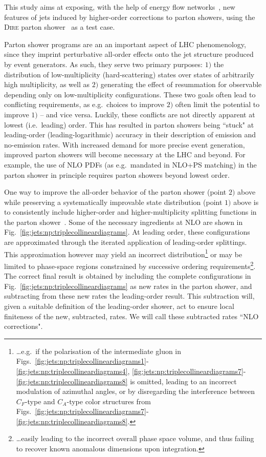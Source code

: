 
This study aims at exposing, with the help of energy flow 
networks~\cite{Komiske:2018cqr}, new features of jets induced by higher-order
corrections to parton showers, using the \textsc{Dire} parton shower~\cite{Hoche:2015sya}
as a test case.

Parton shower programs are an an important aspect
of LHC phenomenology, since they imprint perturbative all-order effects onto the
jet structure produced by event generators. As such, they serve two primary
purposes: $1)$ the distribution of low-multiplicity
(hard-scattering) states over states of arbitrarily high multiplicity, as well
as $2)$ generating the effect of resummation for observable depending only on 
low-multiplicity configurations. These two goals often lead to conflicting
requirements, as e.g.\ choices to improve
$2)$ often limit the potential to improve $1)$ -- and vice versa. Luckily,
these conflicts are not directly apparent at lowest (i.e.\ leading) order. This
has resulted in parton showers being ``stuck" at leading-order 
(leading-logarithmic) accuracy in their description of emission and 
no-emission rates. With increased demand for more precise event generation, 
improved parton showers will become necessary at the LHC and beyond. For 
example, the use of NLO PDFs (as e.g.\ mandated in NLO+PS
matching) in the parton shower in principle requires parton showers beyond
lowest order.

One way to improve the all-order behavior of the parton shower (point $2)$ 
above while preserving a systematically improvable state distribution (point $1)$ 
above is to consistently include higher-order and higher-multiplicity 
splitting functions in the parton 
shower~\cite{Li:2016yez, Hoche:2017iem,Dulat:2018vuy}. Some of the 
necessary ingredients at NLO are shown in 
Fig.~\ref{fig:jets:np:triplecollineardiagrams}. 
At leading order, these configurations are approximated through the iterated 
application of leading-order splittings. This approximation however may
yield an incorrect distribution\footnote{\dots e.g.\ if the polarisation of 
the intermediate gluon in 
Figs.~\ref{fig:jets:np:triplecollineardiagrams1}-\ref{fig:jets:np:triplecollineardiagrams4},
\ref{fig:jets:np:triplecollineardiagrams7}-\ref{fig:jets:np:triplecollineardiagrams8}
is omitted, leading to an incorrect modulation of azimuthal angles,
or by disregarding the interference between
$C_F$-type and $C_A$-type color structures from 
Figs.~\ref{fig:jets:np:triplecollineardiagrams7}-\ref{fig:jets:np:triplecollineardiagrams8}.}
or may be limited to phase-space regions constrained by successive 
ordering requirements\footnote{\dots easily leading to the 
incorrect overall phase space volume, and thus failing to recover known anomalous
dimensions upon integration.}.
The correct final result is obtained by including the 
complete configurations in Fig.~\ref{fig:jets:np:triplecollineardiagrams}
as new rates in the parton shower, and subtracting from these new rates
the leading-order result. This subtraction will, given a suitable definition
of the leading-order shower, act to ensure local finiteness of the new, 
subtracted, rates. We will call these subtracted rates ``NLO corrections".

